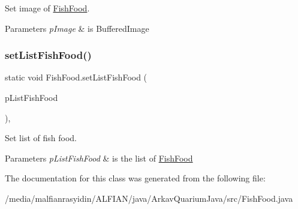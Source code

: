Set image of \mbox{\hyperlink{class_fish_food}{Fish\+Food}}.


\begin{DoxyParams}{Parameters}
{\em p\+Image} & is Buffered\+Image \\
\hline
\end{DoxyParams}
\mbox{\label{class_fish_food_ab2ad298b74bf3d3d0104ce0cffbaf7ff}} 
\subsubsection{\texorpdfstring{set\+List\+Fish\+Food()}{setListFishFood()}}
{\footnotesize\ttfamily static void Fish\+Food.\+set\+List\+Fish\+Food (\begin{DoxyParamCaption}\item[{final \mbox{\hyperlink{class_linked_list}{Linked\+List}}$<$ \mbox{\hyperlink{class_fish_food}{Fish\+Food}} $>$}]{p\+List\+Fish\+Food }\end{DoxyParamCaption})\hspace{0.3cm}{\ttfamily [inline]}, {\ttfamily [static]}}

Set list of fish food.


\begin{DoxyParams}{Parameters}
{\em p\+List\+Fish\+Food} & is the list of \mbox{\hyperlink{class_fish_food}{Fish\+Food}} \\
\hline
\end{DoxyParams}


The documentation for this class was generated from the following file\+:\begin{DoxyCompactItemize}
\item 
/media/malfianrasyidin/\+A\+L\+F\+I\+A\+N/java/\+Arkav\+Quarium\+Java/src/Fish\+Food.\+java\end{DoxyCompactItemize}
